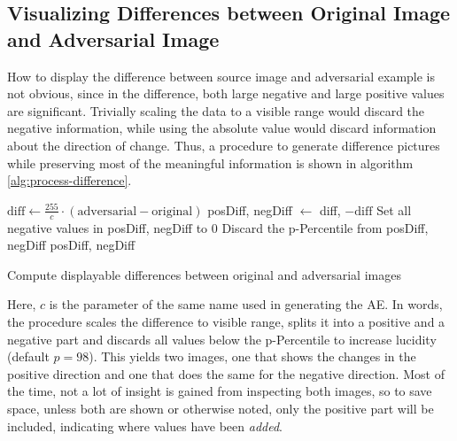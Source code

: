 \documentclass[11pt, a4paper]{article}
\newcommand\braces[1]{\left(#1\right)}
\begin{document}
\begin{appendix}
	\section{Visualizing Differences between Original Image and Adver\-sarial Image}
	\label{sec:visualizing-diff}
	How to display the difference between source image and adversarial example is not obvious, since in the difference, both large negative and large positive values are significant. Trivially scaling the data to a visible range would discard the negative information, while using the absolute value would discard information about the direction of change. Thus, a procedure to generate difference pictures while preserving most of the meaningful information is shown in algorithm \ref{alg:process-difference}.
	
\begin{algorithm}
	\begin{algorithmic}
			\State $\text{diff} \gets \frac{255}{c} \cdot \braces{\text{adversarial} - \text{original}}$
			\State posDiff, negDiff $\gets$ diff, $- \text{diff}$
			\State
			\State Set all negative values in posDiff, negDiff to 0
			\State Discard the p-Percentile from posDiff, negDiff
			\State
			\State \Return posDiff, negDiff
		\EndFunction
	\end{algorithmic}
	\caption[Displaying differences between original and adversarial images]{Compute displayable differences between original and adversarial images}
	\label{alg:process-difference}
\end{algorithm}
	
	Here, $c$ is the parameter of the same name used in generating the AE. In words, the procedure scales the difference to visible range, splits it into a positive and a negative part and discards all values below the p-Percentile to increase lucidity (default $p = 98$). This yields two images, one that shows the changes in the positive direction and one that does the same for the negative direction. Most of the time, not a lot of insight is gained from inspecting both images, so to save space, unless both are shown or otherwise noted, only the positive part will be included, indicating where values have been \emph{added}.
\end{appendix}

\listoffigures
\listoftables
\listofalgorithms

%

\end{document}

